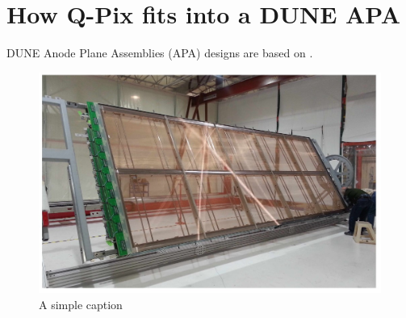 \section{How Q-Pix fits into a DUNE APA}

DUNE Anode Plane Assemblies (APA) designs are based on \citep{DUNE-FD_TDRv4:Abi_2020}.

\begin{figure}[]
\centering
\includegraphics[width=\textwidth]{images/dune_fd_tdr_apa_image.jpg}
\caption{A simple caption \citep{DUNE-FD_TDRv4:Abi_2020}}
\end{figure}
